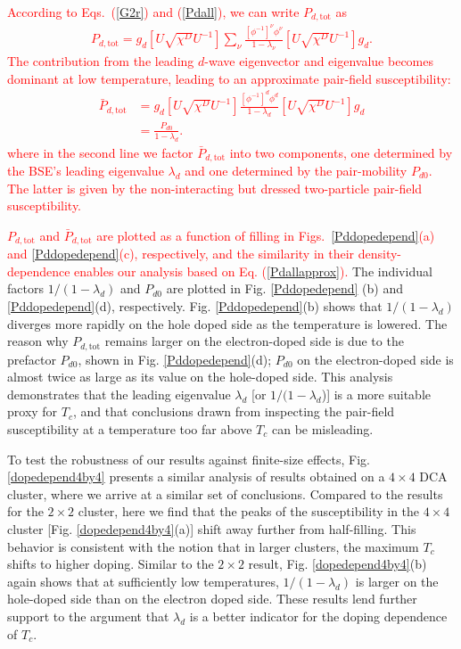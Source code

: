 \documentclass[reprint,nofootinbib,nobibnotes,amsmath,amssymb,aps,prb,floatfix]{revtex4-1}
\newcommand{\beq}{\begin{equation}}
\newcommand{\eeq}{\end{equation}}
\newcommand{\disp}[1]{Eq. (\ref{#1})}
\newcommand{\figdisp}[1]{Fig. \ref{#1}}
\begin{document}
\textcolor{red}{
According to Eqs.~(\ref{G2r}) and (\ref{Pdall}), we can write $P_{d,\text{tot}}$ as
\beq
\begin{split}
P_{d,\text{tot}}=g_d
[U\sqrt{\chi^D}U^{-1}]\sum_{\nu}\frac{[\phi^{-1}]^{\nu}\phi^{\nu}}{1-\lambda_{\nu}}[U\sqrt{\chi^D}U^{-1}]g_d.\label{Pdall2}
\end{split}
\eeq
The contribution from the leading $d$-wave eigenvector and eigenvalue becomes dominant at low temperature, leading to an approximate pair-field susceptibility:
\beq
\begin{split}
\bar{P}_{d,\text{tot}}&=g_d
[U\sqrt{\chi^D}U^{-1}]\frac{[\phi^{-1}]^{d}\phi^{d}}{1-\lambda_{d}}[U\sqrt{\chi^D}U^{-1}]g_d
\\&=\frac{P_{d0}}{1-\lambda_d}.\label{Pdallapprox}
\end{split}
\eeq
where in the second line we factor $\bar{P}_{d,\text{tot}}$ into two components, one determined by the BSE's leading eigenvalue $\lambda_d$ and one determined by the pair-mobility $P_{d0}$. The latter is 
given by the non-interacting but dressed two-particle pair-field susceptibility.}

\textcolor{red}{
$P_{d,\text{tot}}$ and $\bar{P}_{d,\text{tot}}$ are plotted as a function 
of filling in Figs.~\ref{Pddopedepend}(a) and \ref{Pddopedepend}(c), respectively, and the similarity in their density-dependence enables our analysis based on \disp{Pdallapprox}. }
The individual factors $1/(1-\lambda_d)$ and $P_{d0}$ are plotted in \figdisp{Pddopedepend} (b) and \ref{Pddopedepend}(d), respectively. \figdisp{Pddopedepend}(b) shows that $1/(1-\lambda_d)$ diverges more rapidly on the hole doped side as the temperature is lowered. 
The reason why $P_{d,\text{tot}}$ remains larger on the electron-doped side is due to 
the prefactor $P_{d0}$, shown in \figdisp{Pddopedepend}(d); $P_{d0}$ on the electron-doped side is almost twice as large as its value on the hole-doped side. 
This analysis demonstrates that the leading eigenvalue $\lambda_d$ [or $1/(1-\lambda_d$)] is a more suitable proxy for $T_c$, and that conclusions drawn from inspecting the pair-field susceptibility at a temperature too far above $T_c$ can be misleading. 

To test the robustness of our results against finite-size effects, \figdisp{dopedepend4by4} presents a similar analysis of results obtained on a $4\times4$ DCA cluster, where we arrive at a similar set of conclusions. Compared to the results for the $2\times 2$ cluster, here we find that the peaks of the susceptibility in the $4\times4$ cluster [\figdisp{dopedepend4by4}(a)] shift away further from half-filling. This behavior is consistent with the notion that in larger clusters, the maximum $T_c$ shifts to higher doping. Similar to the $2\times 2$ result, \figdisp{dopedepend4by4}(b) again shows that at sufficiently low temperatures, $1/(1-\lambda_d)$ is larger on the hole-doped side than on the electron doped side. These results lend further support to the argument that $\lambda_d$ is a better indicator for the doping dependence of $T_c$.
\end{document}
